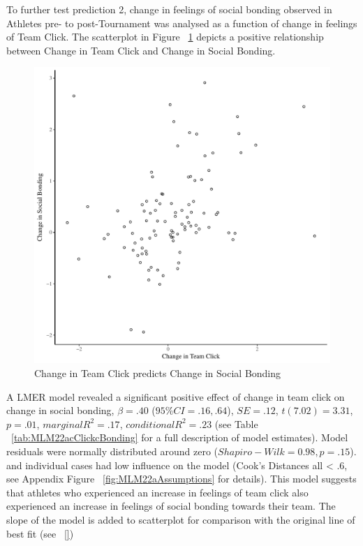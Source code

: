 To further test prediction 2, change in feelings of social bonding observed in Athletes pre- to post-Tournament was analysed as a function of change in feelings of Team Click. The scatterplot in Figure ~\ref{fig:clickBondDeltaBasicXY} depicts a positive relationship between Change in Team Click and Change in Social Bonding.

    \begin{figure}[htbp]
      \centering
    \includegraphics[scale=.5]{images/clickBondDeltaBasicXY.pdf}
      \caption{Change in Team Click predicts Change in Social Bonding}
      \label{fig:clickBondDeltaBasicXY}
    \end{figure}

A LMER model revealed a significant positive effect of change in team click on change in social bonding, $\beta = .40$ ($95\% CI =  .16, .64$), $SE = .12$, $t(7.02) = 3.31$, $p = .01$, $marginal R^2 = .17$, $conditional R^2 = .23$ (see Table ~\ref{tab:MLM22acClickcBonding} for a full description of model estimates).  Model residuals were normally distributed around zero ($Shapiro-Wilk = 0.98, p = .15$). and individual cases had low influence on the model (Cook's Distances all < .6, see Appendix Figure ~\ref{fig:MLM22aAssumptions} for details). This model suggests that athletes who experienced an increase in feelings of team click also experienced an increase in feelings of social bonding towards their team.  The slope of the model is added to scatterplot for comparison with the original line of best fit (see ~\ref{})

